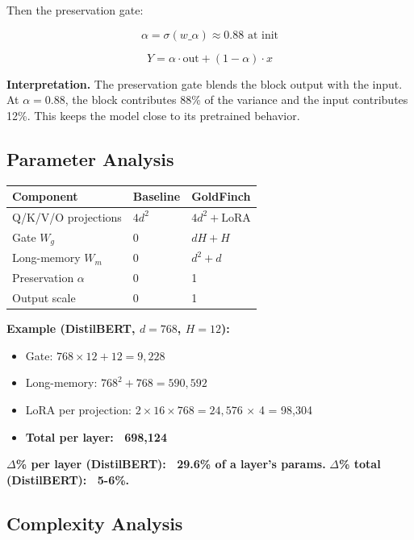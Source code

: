 Then the preservation gate:

\[
\alpha = \sigma(w\_\alpha) \approx 0.88 \text{ at init}
\tag{4.10}
\]

\[
Y = \alpha \cdot \text{out} + (1 - \alpha) \cdot x
\tag{4.11}
\]

\textbf{Interpretation.} The preservation gate blends the block output with the 
input. At $\alpha = 0.88$, the block contributes 88\% of the variance and 
the input contributes 12\%. This keeps the model close to its pretrained 
behavior.

\subsection{Parameter Analysis}

\begin{table}[H]
\centering
\small
\begin{tabular}{lll}
\toprule
\textbf{Component} & \textbf{Baseline} & \textbf{GoldFinch} \\
\midrule
Q/K/V/O projections & $4 d^2$ & $4 d^2 + \text{LoRA}$ \\
Gate $W_g$ & 0 & $d H + H$ \\
Long-memory $W_m$ & 0 & $d^2 + d$ \\
Preservation $\alpha$ & 0 & 1 \\
Output scale & 0 & 1 \\
\bottomrule
\end{tabular}
\end{table}

\textbf{Example (DistilBERT, $d = 768$, $H = 12$):}
\begin{itemize}
\item Gate: $768 \times 12 + 12 = 9{,}228$
\item Long-memory: $768^2 + 768 = 590{,}592$
\item LoRA per projection: $2 \times 16 \times 768 = 24{,}576$ $\times$ 4 = 98,304
\item \textbf{Total per layer: ~698,124}

\end{itemize}
\textbf{$\Delta$\% per layer (DistilBERT): ~29.6\% of a layer's params.}
\textbf{$\Delta$\% total (DistilBERT): ~5-6\%.}

\subsection{Complexity Analysis}

